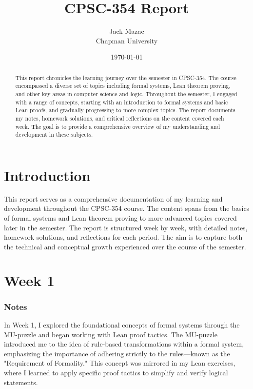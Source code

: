 \documentclass{article}
\title{CPSC-354 Report}
\author{Jack Mazac  \\ Chapman University}
\date{\today}
\theoremstyle{theorem}
\theoremstyle{definition}
\theoremstyle{remark}
\begin{document}
\maketitle

\begin{abstract}
This report chronicles the learning journey over the semester in CPSC-354. The course encompassed a diverse set of topics including formal systems, Lean theorem proving, and other key areas in computer science and logic. Throughout the semester, I engaged with a range of concepts, starting with an introduction to formal systems and basic Lean proofs, and gradually progressing to more complex topics. The report documents my notes, homework solutions, and critical reflections on the content covered each week. The goal is to provide a comprehensive overview of my understanding and development in these subjects.
\end{abstract}

\setcounter{tocdepth}{3}
\tableofcontents

\section{Introduction}\label{intro}

This report serves as a comprehensive documentation of my learning and development throughout the CPSC-354 course. The content spans from the basics of formal systems and Lean theorem proving to more advanced topics covered later in the semester. The report is structured week by week, with detailed notes, homework solutions, and reflections for each period. The aim is to capture both the technical and conceptual growth experienced over the course of the semester.

\section{Week 1}

\subsubsection*{Notes}

In Week 1, I explored the foundational concepts of formal systems through the MU-puzzle and began working with Lean proof tactics. The MU-puzzle introduced me to the idea of rule-based transformations within a formal system, emphasizing the importance of adhering strictly to the rules—known as the "Requirement of Formality." This concept was mirrored in my Lean exercises, where I learned to apply specific proof tactics to simplify and verify logical statements.
\end{document}
